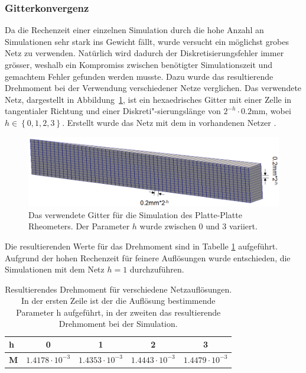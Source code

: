 \subsubsection{Gitterkonvergenz}
Da die Rechenzeit einer einzelnen Simulation durch die hohe Anzahl an Simulationen sehr stark ins Gewicht fällt, wurde versucht ein möglichst grobes Netz zu verwenden. Natürlich wird dadurch der Diskretisierungsfehler immer grösser, weshalb ein Kompromiss zwischen benötigter Simulationszeit und gemachtem Fehler gefunden werden musste.
Dazu wurde das resultierende Drehmoment bei der Verwendung verschiedener Netze verglichen.  
Das verwendete Netz, dargestellt in Abbildung~\ref{fig:PlatteRheoGitter}, ist ein he\-xa\-edri\-sches Gitter mit einer Zelle in tangentialer Richtung und einer Diskreti"-sierungslänge von $2^{-h} \cdot 0.2\mbox{mm}$, wobei $h\in\left\{ 0,1,2,3 \right\}$. Erstellt wurde das Netz mit dem in \openfoam{} vorhandenen Netzer .
%
\begin{figure}[tb]
    \centering
    \includegraphics[width=\textwidth]{figures/PlatteRheoGitterAnnot.png}
    \caption{Das verwendete Gitter für die Simulation des Platte-Platte Rheometers. Der Parameter $h$ wurde zwischen 0 und 3 variiert.}
    \label{fig:PlatteRheoGitter}
\end{figure}
%
Die resultierenden Werte für das Drehmoment sind in Tabelle \ref{fig:ResultingTorque} aufgeführt. Aufgrund der hohen Rechenzeit für feinere Auflösungen wurde entschieden, die Simulationen mit dem Netz $h=1$ durchzuführen.
%
\begin{table}[tbh]
    \centering
    \begin{tabular}{l c c c c}
        \textbf{h} & 0 & 1 & 2 & 3\\
        \midrule
        \textbf{M} & $1.4178\cdot10^{-3}$ & $1.4353\cdot10^{-3}$ & $1.4443\cdot10^{-3}$ & $1.4479\cdot10^{-3}$\\
    \end{tabular}
    \caption{Resultierendes Drehmoment für verschiedene Netzauflösungen.
    In der ersten Zeile ist der die Auflösung bestimmende Parameter h aufgeführt, in der zweiten das resultierende Drehmoment bei der Simulation.}
    \label{fig:ResultingTorque}
\end{table}
%
